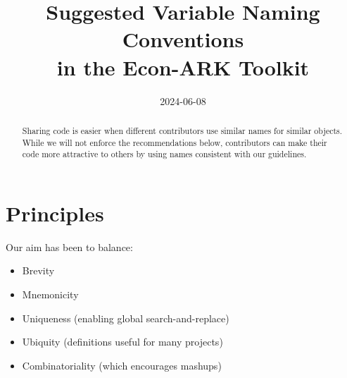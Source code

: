 \documentclass{econark}
\begin{document}
\newcommand{\texname}{NARK}

\title{Suggested Variable Naming Conventions \\ in the Econ-ARK Toolkit}

\date{2024-06-08} %
\vspace{2in}



\maketitle


\begin{abstract}
  Sharing code is easier when different contributors use similar names for similar objects.  While we will not enforce the
  recommendations below, contributors can make their code more attractive to others
  by using names consistent with our guidelines.
\end{abstract}




\pagebreak

\section{Principles}
Our aim has been to balance:
\begin{itemize}
\item Brevity
\item Mnemonicity
\item Uniqueness (enabling global search-and-replace)
\item Ubiquity (definitions useful for many projects)
\item Combinatoriality (which encourages mashups)
\end{itemize}
\end{document}
